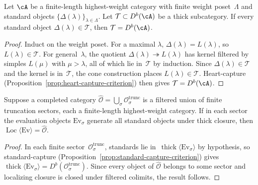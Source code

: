 \begin{proposition}
\label{prop:standard-capture-criterion}
Let $\cA$ be a finite-length highest-weight category with finite
weight poset~$\Lambda$ and standard objects
$\{\Delta(\lambda)\}_{\lambda \in \Lambda}$.
Let $\mathcal{T} \subset D^b(\cA)$ be a thick subcategory.
If every standard object $\Delta(\lambda) \in \mathcal{T}$, then
$\mathcal{T} = D^b(\cA)$.
\end{proposition}
\begin{proof}
Induct on the weight poset.  For a maximal $\lambda$,
$\Delta(\lambda) = L(\lambda)$, so $L(\lambda) \in \mathcal{T}$.
For general~$\lambda$, the quotient
$\Delta(\lambda) \twoheadrightarrow L(\lambda)$ has kernel
filtered by simples $L(\mu)$ with $\mu > \lambda$, all of which
lie in~$\mathcal{T}$ by induction.
Since $\Delta(\lambda) \in \mathcal{T}$ and the kernel is in~$\mathcal{T}$,
the cone construction places $L(\lambda) \in \mathcal{T}$.
Heart-capture
(Proposition~\ref{prop:heart-capture-criterion}) then gives
$\mathcal{T} = D^b(\cA)$.
\end{proof}

\begin{corollary}
\label{cor:sectorwise-localizing-generation}
Suppose a completed category
$\widehat{\mathcal{O}} = \bigcup_\sigma \mathcal{O}_\sigma^{\mathrm{trunc}}$
is a filtered union of finite truncation sectors, each a
finite-length highest-weight category.  If in each sector the
evaluation objects $\mathrm{Ev}_\sigma$ generate all standard objects
under thick closure, then
$\operatorname{Loc}\langle \mathrm{Ev} \rangle = \widehat{\mathcal{O}}$.
\end{corollary}
\begin{proof}
In each finite sector~$\mathcal{O}_\sigma^{\mathrm{trunc}}$,
standards lie in~$\operatorname{thick}\langle \mathrm{Ev}_\sigma \rangle$
by hypothesis, so standard-capture
(Proposition~\ref{prop:standard-capture-criterion}) gives
$\operatorname{thick}\langle \mathrm{Ev}_\sigma \rangle =
D^b(\mathcal{O}_\sigma^{\mathrm{trunc}})$.
Since every object of $\widehat{\mathcal{O}}$ belongs to some sector
and localizing closure is closed under filtered colimits, the result
follows.
\end{proof}

